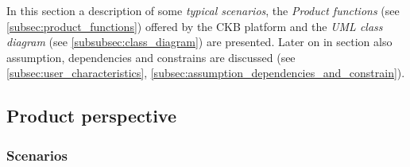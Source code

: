 \documentclass[../RASD.tex]{subfiles}
\begin{document}
    \graphicspath{{\subfix{assets/section_2/}}}

    In this section a description of some \textit{typical scenarios}, the \textit{Product functions} (see \ref{subsec:product_functions}) offered by the CKB platform and the \textit{UML class diagram} (see \ref{subsubsec:class_diagram}) are presented.
    Later on in section also assumption, dependencies and constrains are discussed (see \ref{subsec:user_characteristics}, \ref{subsec:assumption_dependencies_and_constrain}).
    \subsection{Product perspective}\label{subsec:product_perspective}
    \subsubsection{Scenarios}\label{subsubsec:scenarios}
\end{document}
